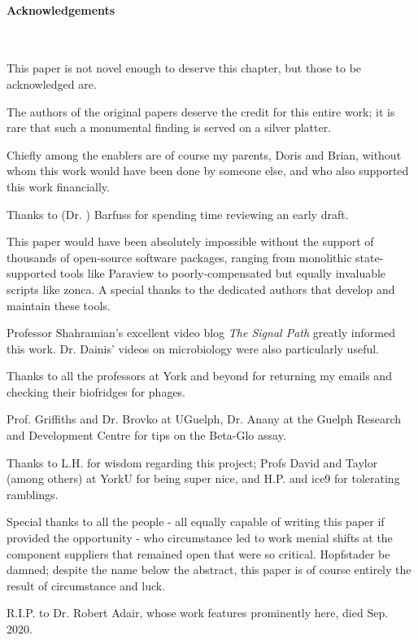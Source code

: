 \documentclass[paper.tex]{subfiles}
\begin{document}
	
\clearpage
\paragraph{Acknowledgements}\

This paper is not novel enough to deserve this chapter, but those to be acknowledged are.

The authors of the original papers deserve the credit for this entire work; it is rare that such a monumental finding is served on a silver platter.

Chiefly among the enablers are of course my parents, Doris and Brian, without whom this work would have been done by someone else, and who also supported this work financially. 

Thanks to (Dr. ) Barfuss for spending time reviewing an early draft.

This paper would have been absolutely impossible without the support of thousands of open-source software packages, ranging from monolithic state-supported tools like Paraview to poorly-compensated but equally invaluable scripts like zonca. A special thanks to the dedicated authors that develop and maintain these tools.

Professor Shahramian's excellent video blog {\it The Signal Path} greatly informed this work. Dr. Dainis' videos on microbiology were also particularly useful.

Thanks to all the professors at York and beyond for returning my emails and checking their biofridges for phages.

Prof. Griffiths and Dr. Brovko at UGuelph, Dr. Anany at the Guelph Research and Development Centre for tips on the Beta-Glo assay.

Thanks to L.H. for wisdom regarding this project; Profs David and Taylor (among others) at YorkU for being super nice, and H.P. and ice9 for tolerating ramblings.

Special thanks to all the people - all equally capable of writing this paper if provided the opportunity - who circumstance led to work menial shifts at the component suppliers that remained open that were so critical. Hopfstader be damned; despite the name below the abstract, this paper is of course entirely the result of circumstance and luck. 

R.I.P. to Dr. Robert Adair, whose work features prominently here, died Sep. 2020. 
\end{document}
